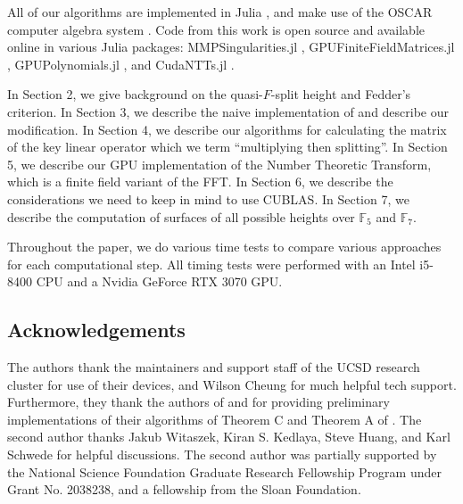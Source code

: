 All of our algorithms are implemented in Julia 
\cite{julia-2017}, and
make use of the OSCAR computer algebra system 
\cite{OSCAR-book}.
Code from this work is open source and available online 
in various
Julia packages: 
MMPSingularities.jl \cite{mmpsingularities-jl},
GPUFiniteFieldMatrices.jl \cite{gpuffmatrices-jl}, 
GPUPolynomials.jl \cite{gpupolynomials-jl},
and CudaNTTs.jl \cite{cudantts-jl}.

In Section 2, we give background on the quasi-\(F\)-split height
and Fedder's criterion.
In Section 3, we describe the naive implementation of
\cite[Theorem~C]{kty-2022-fedder} and describe
our modification.
In Section 4, we describe our algorithms for calculating the matrix
of the key linear operator which we term ``multiplying then splitting''.
In Section 5, we describe our GPU implementation of the Number Theoretic
Transform, which is a finite field variant of the FFT.
In Section 6, we describe the considerations we need to keep in mind
to use CUBLAS.
In Section 7, we describe the computation of surfaces of all possible
heights over \(\mathbb{F}_{5}\) and \(\mathbb{F}_{7}\).

Throughout the paper, we do various time tests to compare various
approaches for each computational step.
All timing tests were performed with 
an Intel i5-8400 CPU and a Nvidia GeForce RTX 3070 GPU.

\subsection{Acknowledgements}

The authors thank the maintainers and support staff 
of the UCSD research cluster for use of their devices,
and Wilson Cheung for much helpful tech support.
Furthermore, they thank the authors of 
\cite{kty-2022-fedder} and \cite{fgmq-2025-witt-vectors-macaulay2}
for providing preliminary implementations of 
their algorithms of Theorem C and Theorem A of 
\cite{kty-2022-fedder}.
The second author thanks Jakub Witaszek, Kiran S. Kedlaya,
Steve Huang, and Karl Schwede for helpful discussions.
The second author was partially supported by the 
National Science Foundation Graduate Research
Fellowship Program under Grant No. 2038238, and a fellowship
from the Sloan Foundation.

